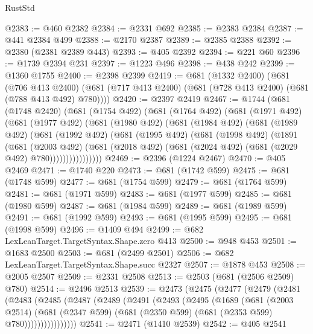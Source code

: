 \begin{lexlean}{RustStd}
\begin{coremodule}
@2383 := @460 @2382
@2384 := @2331 @692
@2385 := @2383 @2384
@2387 := @441 @2384 @499
@2388 := @2170 @2387
@2389 := @2385 @2388
@2392 := @2380 (@2381 @2389 @443)
@2393 := @405 @2392
@2394 := @221 @60
@2396 := @1739 @2394 @231
@2397 := @1223 @496
@2398 := @438 @242
@2399 := @1360 @1755
@2400 := @2398 @2399
@2419 := @681
    (@1332 @2400)
    (@681
      (@706 @413 @2400)
      (@681 (@717 @413 @2400) (@681 (@728 @413 @2400) (@681 (@788 @413 @492) @780))))
@2420 := @2397 @2419
@2467 := @1744
    (@681
      (@1748 @2420)
      (@681
        (@1754 @492)
        (@681
          (@1764 @492)
          (@681
            (@1971 @492)
            (@681
              (@1977 @492)
              (@681
                (@1980 @492)
                (@681
                  (@1984 @492)
                  (@681
                    (@1989 @492)
                    (@681
                      (@1992 @492)
                      (@681
                        (@1995 @492)
                        (@681
                          (@1998 @492)
                          (@1891
                            (@681
                              (@2003 @492)
                              (@681
                                (@2018 @492)
                                (@681 (@2024 @492) (@681 (@2029 @492) @780))))))))))))))))
@2469 := @2396 (@1224 @2467)
@2470 := @405 @2469
@2471 := @1740 @220
@2473 := @681 (@1742 @599)
@2475 := @681 (@1748 @599)
@2477 := @681 (@1754 @599)
@2479 := @681 (@1764 @599)
@2481 := @681 (@1971 @599)
@2483 := @681 (@1977 @599)
@2485 := @681 (@1980 @599)
@2487 := @681 (@1984 @599)
@2489 := @681 (@1989 @599)
@2491 := @681 (@1992 @599)
@2493 := @681 (@1995 @599)
@2495 := @681 (@1998 @599)
@2496 := @1409 @494
@2499 := @682 LexLeanTarget.TargetSyntax.Shape.zero @413
@2500 := @948 @453
@2501 := @1683 @2500
@2503 := @681 (@2499 @2501)
@2506 := @682 LexLeanTarget.TargetSyntax.Shape.succ @2327
@2507 := @1878 @453
@2508 := @2005 @2507
@2509 := @2331 @2508
@2513 := @2503 (@681 (@2506 @2509) @780)
@2514 := @2496 @2513
@2539 := @2473
    (@2475
      (@2477
        (@2479
          (@2481
            (@2483
              (@2485
                (@2487
                  (@2489
                    (@2491
                      (@2493
                        (@2495
                          (@1689
                            (@681
                              (@2003 @2514)
                              (@681
                                (@2347 @599)
                                (@681 (@2350 @599) (@681 (@2353 @599) @780))))))))))))))))
@2541 := @2471 (@1410 @2539)
@2542 := @405 @2541

\end{coremodule}
\end{lexlean}
